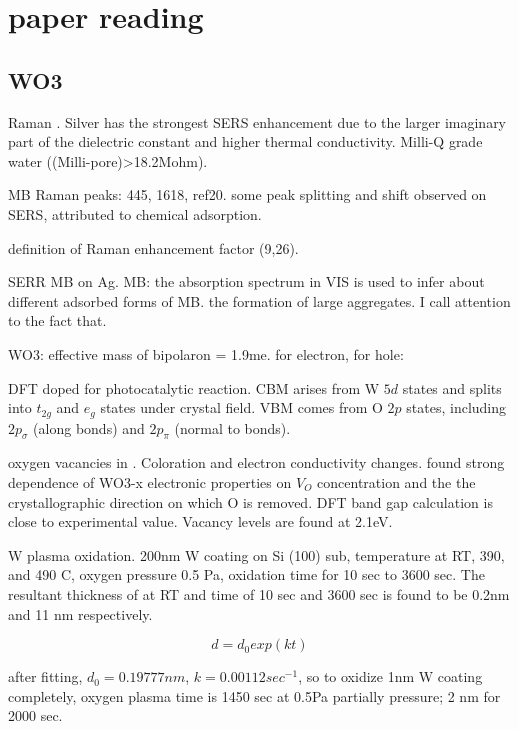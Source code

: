 \chapter{paper reading}



\section{WO3}

Raman \cite{Xiao2007}. Silver has the strongest SERS enhancement due to the larger imaginary part of the dielectric constant and higher thermal conductivity. Milli-Q grade water ((Milli-pore)\textgreater 18.2Mohm).

MB Raman peaks: 445, 1618, ref20. some peak splitting and shift observed on SERS, attributed to chemical adsorption.

definition of Raman enhancement factor (9,26).

SERR MB on Ag. \cite{Nicolai2003}
MB: the absorption spectrum in VIS is used to infer about different adsorbed forms of MB. the formation of large aggregates. I call attention to the fact that.

WO3: effective mass of bipolaron = 1.9me. for electron, for hole:

DFT doped  for photocatalytic reaction.\cite{Wang2012} CBM arises from W $5d$ states and splits into $t_{2g}$ and $e_g$ states under crystal field. VBM comes from O $2p$ states, including $2p_\sigma$ (along  bonds) and $2p_\pi$ (normal to  bonds).

oxygen vacancies in .\cite{Wang2011b}  Coloration and electron conductivity changes. \citeauthor{Wang2011b} found strong dependence of WO3-x electronic properties on $V_O$ concentration and the the crystallographic direction on which O is removed. DFT band gap calculation is close to experimental value. Vacancy levels are found at 2.1eV.



W plasma oxidation.\cite{Romanyuk2005} 200nm W coating on Si (100) sub, temperature at RT, 390, and 490 C, oxygen pressure 0.5 Pa, oxidation time for 10 sec to 3600 sec. The resultant thickness of  at RT  and time of 10 sec and 3600 sec is found to be 0.2nm and 11 nm respectively.

\[
 d = d_0 exp(kt)
\]

after fitting, $d_0 = 0.19777 nm$, $k = 0.00112 sec^{-1}$, so to oxidize 1nm W coating completely, oxygen plasma time is 1450 sec at 0.5Pa partially pressure; 2 nm for 2000 sec.

